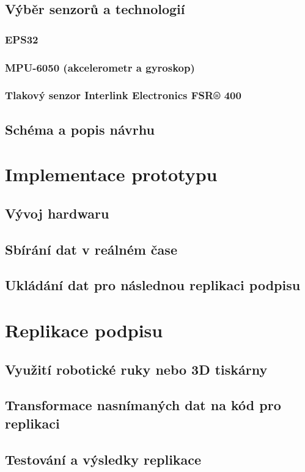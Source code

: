 \section{Výběr senzorů a technologií}
\subsection{EPS32}
\subsection{MPU-6050 (akcelerometr a gyroskop)}
\subsection{Tlakový senzor Interlink Electronics FSR® 400}
\section{Schéma a popis návrhu}

\chapter{Implementace prototypu}
\section{Vývoj hardwaru}
\section{Sbírání dat v reálném čase}
\section{Ukládání dat pro následnou replikaci podpisu}

\chapter{Replikace podpisu}
\section{Využití robotické ruky nebo 3D tiskárny}
\section{Transformace nasnímaných dat na kód pro replikaci}
\section{Testování a výsledky replikace}


